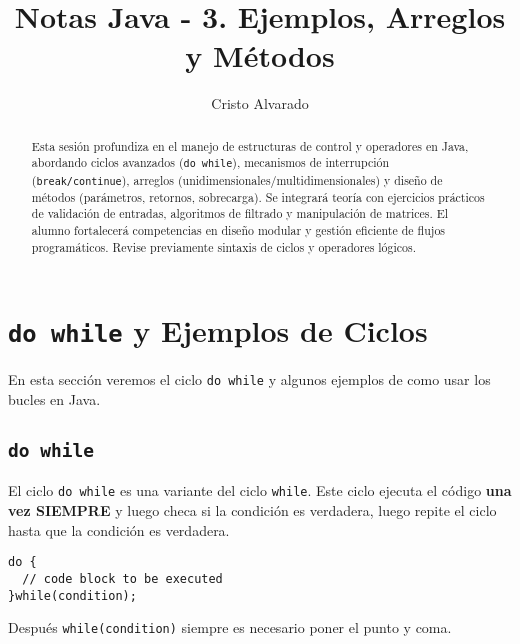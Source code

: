 \documentclass[12pt]{article}
\theoremstyle{largebreak}
\begin{document}
    \setlength{\parskip}{5pt}
    \setlength{\parindent}{12pt}
    \title{Notas Java - 3. Ejemplos, Arreglos y Métodos}
    \author{Cristo Alvarado}
    \maketitle

    \begin{abstract}
        Esta sesión profundiza en el manejo de estructuras de control y operadores en Java, abordando ciclos avanzados (\texttt{do while}), mecanismos de interrupción (\texttt{break/continue}), arreglos (unidimensionales/multidimensionales) y diseño de métodos (parámetros, retornos, sobrecarga). Se integrará teoría con ejercicios prácticos de validación de entradas, algoritmos de filtrado y manipulación de matrices. El alumno fortalecerá competencias en diseño modular y gestión eficiente de flujos programáticos. Revise previamente sintaxis de ciclos y operadores lógicos.
    \end{abstract}
    
    \tableofcontents

    \lstlistoflistings

    \section{\lstinline|do while| y Ejemplos de Ciclos}

    En esta sección veremos el ciclo \lstinline|do while| y algunos ejemplos de como usar los bucles en Java.

    \subsection{\lstinline|do while|}

    El ciclo \lstinline|do while| es una variante del ciclo \lstinline|while|. Este ciclo ejecuta el código \textbf{una vez SIEMPRE} y luego checa si la condición es verdadera, luego repite el ciclo hasta que la condición es verdadera.

    \begin{lstlisting}[caption={Sintaxis \lstinline|do while|},label=DescriptiveLabel]
do {
  // code block to be executed
}while(condition);
    \end{lstlisting}

    \begin{obs}
        Después \lstinline|while(condition)| siempre es necesario poner el punto y coma.
    \end{obs}
\end{document}
